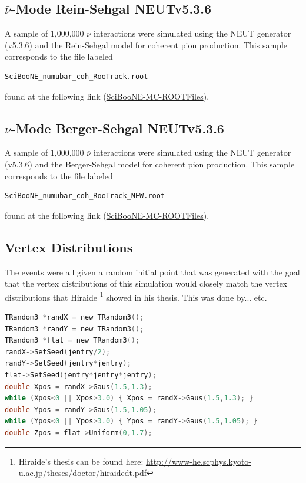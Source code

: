 \documentclass[11pt]{article}
\begin{document}
\subsection{$\bar{\nu}$-Mode Rein-Sehgal NEUTv5.3.6}
A sample of 1,000,000 $\bar{\nu}$ interactions were simulated using the NEUT generator (v5.3.6) and the Rein-Sehgal model for coherent pion production. This sample corresponds to the file labeled
\begin{verbatim}
SciBooNE_numubar_coh_RooTrack.root
\end{verbatim}
found at the following link (\href{https://drive.google.com/open?id=0B4rvJl9swUOxcEtpSl94RDRsc3c}{SciBooNE-MC-ROOTFiles}).

\subsection{$\bar{\nu}$-Mode Berger-Sehgal NEUTv5.3.6}
A sample of 1,000,000 $\bar{\nu}$ interactions were simulated using the NEUT generator (v5.3.6) and the Berger-Sehgal model for coherent pion production. This sample corresponds to the file labeled
\begin{verbatim}
SciBooNE_numubar_coh_RooTrack_NEW.root
\end{verbatim}
found at the following link (\href{https://drive.google.com/open?id=0B4rvJl9swUOxcEtpSl94RDRsc3c}{SciBooNE-MC-ROOTFiles}).




\subsection{Vertex Distributions}
The events were all given a random initial point that was generated with the goal that the vertex distributions of this simulation would closely match the vertex distributions that Hiraide \footnote{Hiraide's thesis can be found here: \href{http://www-he.scphys.kyoto-u.ac.jp/theses/doctor/hiraide_dt.pdf}{http://www-he.scphys.kyoto-u.ac.jp/theses/doctor/hiraide\textunderscore{}dt.pdf}} showed in his thesis. This was done by... etc.

\begin{lstlisting}[language=C]
TRandom3 *randX = new TRandom3();
TRandom3 *randY = new TRandom3();
TRandom3 *flat = new TRandom3();
randX->SetSeed(jentry/2);
randY->SetSeed(jentry*jentry);
flat->SetSeed(jentry*jentry*jentry);
double Xpos = randX->Gaus(1.5,1.3);
while (Xpos<0 || Xpos>3.0) { Xpos = randX->Gaus(1.5,1.3); }
double Ypos = randY->Gaus(1.5,1.05);
while (Ypos<0 || Ypos>3.0) { Ypos = randY->Gaus(1.5,1.05); }
double Zpos = flat->Uniform(0,1.7);
\end{lstlisting}
\end{document}
